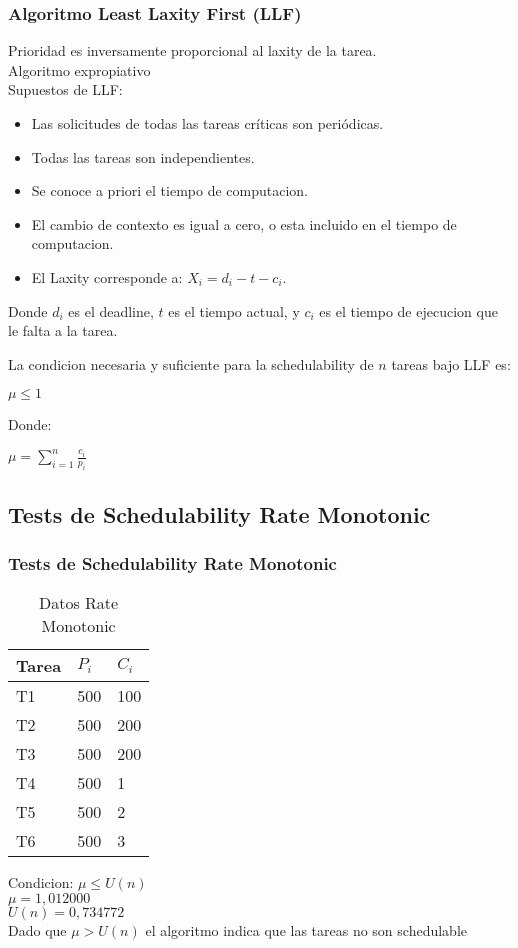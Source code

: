 \documentclass[xcolor=table]{beamer}
\begin{document}
\begin{frame} 
\frametitle{Algoritmo Least Laxity First (LLF)} 

Prioridad es inversamente proporcional al laxity de la tarea. \\
Algoritmo expropiativo\\
Supuestos de LLF:
\begin{itemize}
\item Las solicitudes de todas las tareas críticas son periódicas.
\item Todas las tareas son independientes.
\item Se conoce a priori el tiempo de computacion.
\item El cambio de contexto es igual a cero, o esta incluido en el tiempo de computacion.
\item El Laxity corresponde a: $X_i = d_i - t - c_i$.
\end{itemize} 

Donde $d_i$ es el deadline, $t$ es el tiempo actual, y $c_i$ es el tiempo de ejecucion que le falta a la tarea.

La condicion necesaria y suficiente para la schedulability de $n$ tareas bajo LLF es:
\begin{center}
$\mu \leq 1$
\end{center}

Donde:
\begin{center}
$\mu = \sum_{i=1}^{n}\frac{c_i}{p_i}$
\end{center}

\end{frame}

\subsection{Tests de Schedulability  Rate Monotonic } 

\begin{frame} 
\frametitle{Tests de Schedulability  Rate Monotonic } 
\begin{table} 
\centering 
\begin{tabular}{|l|l|l|} 
\hline 
\cellcolor{lightgray}Tarea & \cellcolor{lightgray}$P_i$ & \cellcolor{lightgray}$C_i$ \\ \hline 
T1   & 500  &  100\\ \hline 
T2   & 500  &  200\\ \hline 
T3   & 500  &  200\\ \hline 
T4   & 500  &  1\\ \hline 
T5   & 500  &  2\\ \hline 
T6   & 500  &  3\\ \hline 
\end{tabular} 
\caption{Datos  Rate Monotonic } 
\end{table} 
Condicion: $\mu \leq U(n)$ \\ 
$\mu =  1,012000 $ \\ 
$U(n) =  0,734772 $ \\ 
Dado que $\mu>U(n)$ el algoritmo indica que las tareas no son schedulable \\ 
\end{frame} 
\end{document}
